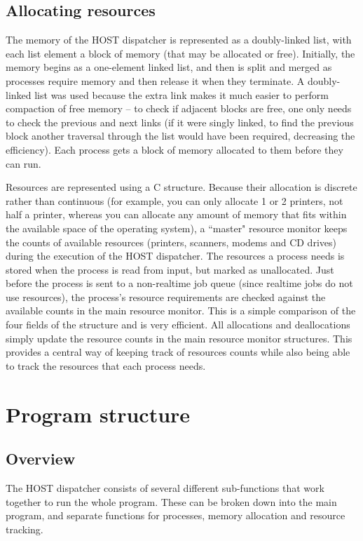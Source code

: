 \documentclass[12pt]{article}
\begin{document}
\subsection{Allocating resources}
The memory of the HOST dispatcher is represented as a doubly-linked list, with
each list element a block of memory (that may be allocated or free). Initially,
the memory begins as a one-element linked list, and then is split and merged
as processes require memory and then release it when they terminate. A doubly-
linked list was used because the extra link makes it much easier to perform
compaction of free memory -- to check if adjacent blocks are free, one only
needs to check the previous and next links (if it were singly linked, to find
the previous block another traversal through the list would have been required,
decreasing the efficiency). Each process gets a block of memory allocated to
them before they can run.

Resources are represented using a C structure. Because their allocation is
discrete rather than continuous (for example, you can only allocate 1 or 2
printers, not half a printer, whereas you can allocate any amount of memory
that fits within the available space of the operating system), a ``master"
resource monitor keeps the counts of available resources (printers, scanners,
modems and CD drives) during the execution of the HOST dispatcher. The 
resources a process needs is stored when the process is read from input, but
marked as unallocated. Just before the process is sent to a non-realtime job
queue (since realtime jobs do not use resources), the process's resource
requirements are checked against the available counts in the main resource
monitor. This is a simple comparison of the four fields of the structure and is
very efficient. All allocations and deallocations simply update the resource
counts in the main resource monitor structures. This provides a central way of
keeping track of resources counts while also being able to track the resources
that each process needs.

\section{Program structure}

\subsection{Overview}
The HOST dispatcher consists of several different sub-functions that work
together to run the whole program. These can be broken down into the main
program, and separate functions for processes, memory allocation and resource
tracking.
\end{document}
